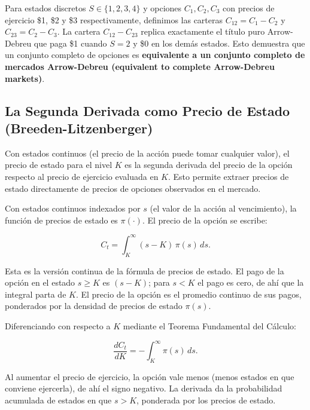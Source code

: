 \documentclass[12pt]{article}
\begin{document}
Para estados discretos $S \in \{1, 2, 3, 4\}$ y opciones $C_1, C_2, C_3$ con precios de ejercicio \$1, \$2 y \$3 respectivamente, definimos las carteras $C_{12} = C_1 - C_2$ y $C_{23} = C_2 - C_3$. La cartera $C_{12} - C_{23}$ replica exactamente el t\'itulo puro Arrow-Debreu que paga \$1 cuando $S = 2$ y \$0 en los dem\'as estados. Esto demuestra que un conjunto completo de opciones es \textbf{equivalente a un conjunto completo de mercados Arrow-Debreu (equivalent to complete Arrow-Debreu markets)}.

\subsection{La Segunda Derivada como Precio de Estado (Breeden-Litzenberger)}

\begin{intuicion}
Con estados continuos (el precio de la acci\'on puede tomar cualquier valor), el precio de estado para el nivel $K$ es la segunda derivada del precio de la opci\'on respecto al precio de ejercicio evaluada en $K$. Esto permite extraer precios de estado directamente de precios de opciones observados en el mercado.
\end{intuicion}

Con estados continuos indexados por $s$ (el valor de la acci\'on al vencimiento), la funci\'on de precios de estado es $\pi(\cdot)$. El precio de la opci\'on se escribe:

\begin{equation}
  C_t = \int_K^{\infty} (s - K)\,\pi(s)\,ds.
  \label{eq:opcioncontinua}
\end{equation}

\begin{intuicionmat}
Esta es la versi\'on continua de la f\'ormula de precios de estado. El pago de la opci\'on en el estado $s \geq K$ es $(s - K)$; para $s < K$ el pago es cero, de ah\'i que la integral parta de $K$. El precio de la opci\'on es el promedio continuo de sus pagos, ponderados por la densidad de precios de estado $\pi(s)$.
\end{intuicionmat}

Diferenciando con respecto a $K$ mediante el Teorema Fundamental del C\'alculo:

\begin{equation}
  \frac{dC_t}{dK} = -\int_K^{\infty} \pi(s)\,ds.
  \label{eq:derivada1}
\end{equation}

\begin{intuicionmat}
Al aumentar el precio de ejercicio, la opci\'on vale menos (menos estados en que conviene ejercerla), de ah\'i el signo negativo. La derivada da la probabilidad acumulada de estados en que $s > K$, ponderada por los precios de estado.
\end{intuicionmat}
\end{document}

